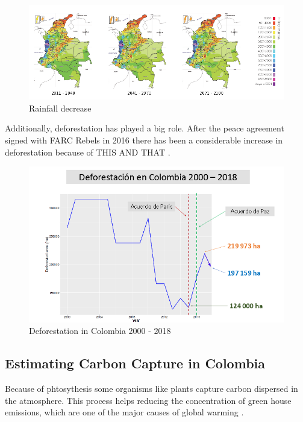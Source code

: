 \documentclass[
]{jss}
\begin{document}
\begin{figure}
\centering
\includegraphics{figures/rainfall.png}
\caption{Rainfall decrease}
\end{figure}

Additionally, deforestation has played a big role. After the peace
agreement signed with FARC Rebels in 2016 there has been a considerable
increase in deforestation because of THIS AND THAT \citet{Pending}.

\begin{figure}
\centering
\includegraphics{figures/deforestation.png}
\caption{Deforestation in Colombia 2000 - 2018}
\end{figure}

\hypertarget{estimating-carbon-capture-in-colombia}{%
\subsection{Estimating Carbon Capture in
Colombia}\label{estimating-carbon-capture-in-colombia}}

Because of phtosythesis some organisms like plants capture carbon
dispersed in the atmosphere. This process helps reducing the
concentration of green house emissions, which are one of the major
causes of global warming \citet{Pending}.
\end{document}
